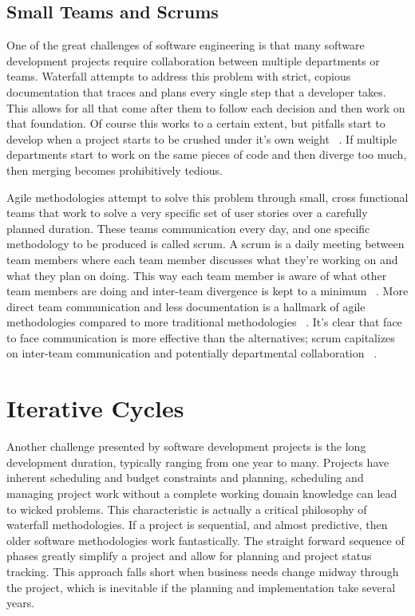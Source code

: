 \documentclass[11pt]{article}
\newcommand{\tab}{\hspace*{2em}}
\begin{document}
\begin{doublespace}
\subsection{Small Teams and Scrums}

\tab One of the great challenges of software engineering is that many software development projects require collaboration between multiple departments or teams. Waterfall attempts to address this problem with strict, copious documentation that traces and plans every single step that a developer takes. This allows for all that come after them to follow each decision and then work on that foundation. Of course this works to a certain extent, but pitfalls start to develop when a project starts to be crushed under it’s own weight ~\cite{Ktata:2009:ADI:1557626.1557636}. If multiple departments start to work on the same pieces of code and then diverge too much, then merging becomes prohibitively tedious. 

\tab Agile methodologies attempt to solve this problem through small, cross functional teams that work to solve a very specific set of user stories over a carefully planned duration. These teams communication every day, and one specific methodology to be produced is called scrum. A scrum is a daily meeting between team members where each team member discusses what they’re working on and what they plan on doing. This way each team member is aware of what other team members are doing and inter-team divergence is kept to a minimum ~\cite{Cao:2010:MDA:1877725.1877730}. More direct team communication and less documentation is a hallmark of agile methodologies compared to more traditional methodologies ~\cite{Stettina:2011:NNE:2038476.2038509}. It's clear that face to face communication is more effective than the alternatives; scrum capitalizes on inter-team communication and potentially departmental collaboration ~\cite{Stettina:2011:NNE:2038476.2038509}.

\section{Iterative Cycles}

\tab Another challenge presented by software development projects is the long development duration, typically ranging from one year to many. Projects have inherent scheduling and budget constraints and planning, scheduling and managing project work without a complete working domain knowledge can lead to wicked problems. This characteristic is actually a critical philosophy of waterfall methodologies. If a project is sequential, and almost predictive, then older software methodologies work fantastically. The straight forward sequence of phases greatly simplify a project and allow for planning and project status tracking. This approach falls short when business needs change midway through the project, which is inevitable if the planning and implementation take several years. 


\end{doublespace}
\end{document}
